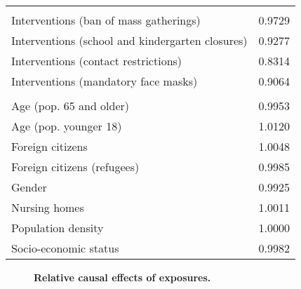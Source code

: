 \documentclass[10pt,letterpaper]{article}
\providecommand{\DIFaddend}{} %
\DeclareRobustCommand{\DIFaddend}{\DIFOaddend \let\includegraphics\DIFOincludegraphics} %
\begin{document}
\begin{table}[!ht]
\begin{tabular}[t]{lr}
\addlinespace[0.3em]
\multicolumn{2}{l}{\textbf{Interventions}}\\
\hspace{1em}Interventions (ban of mass gatherings) & 0.9729\\
\hspace{1em}Interventions (school and kindergarten closures) & 0.9277\\
\hspace{1em}Interventions (contact restrictions) & 0.8314\\
\hspace{1em}Interventions (mandatory face masks) & 0.9064\\
\addlinespace[0.3em]
\multicolumn{2}{l}{\textbf{Demographic}}\\
\hspace{1em}Age (pop. 65 and older) & 0.9953\\
\hspace{1em}Age (pop. younger 18) & 1.0120\\
\hspace{1em}Foreign citizens & 1.0048\\
\hspace{1em}Foreign citizens (refugees) & 0.9985\\
\hspace{1em}Gender & 0.9925\\
\hspace{1em}Nursing homes & 1.0011\\
\hspace{1em}Population density & 1.0000\\
\hspace{1em}Socio-economic status & 0.9982\\
\bottomrule
\end{tabular}
\label{tab:causaleffects}
\end{table}
\DIFaddend 

\begin{figure}[!h]
\caption{{\bf Relative causal effects of exposures.}}
\label{fig:effectsrange}
\end{figure}
\end{document}
